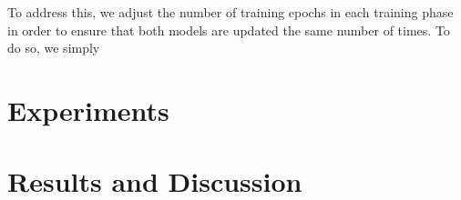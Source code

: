 To address this, we adjust the number of training epochs in each training phase in order to ensure that both models are updated the same number of times. To do so, we simply 

\section{Experiments}

\section{Results and Discussion}